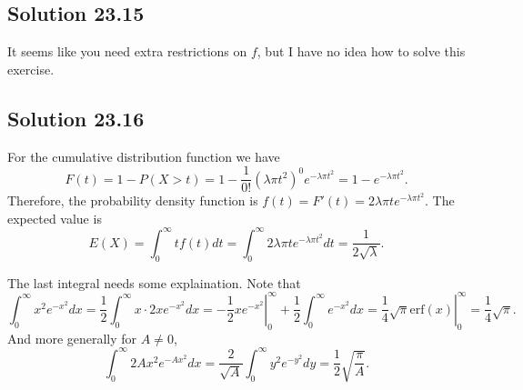 \subsection*{Solution 23.15}

It seems like you need extra restrictions on $f$, but I have no idea how to solve this exercise.


\subsection*{Solution 23.16}

For the cumulative distribution function we have
\begin{equation*}
    F(t) = 1 - P(X > t)
        = 1 - \frac{1}{0!} (\lambda \pi t^2)^0 e^{-\lambda \pi t^2}
        = 1 - e^{-\lambda \pi t^2}.
\end{equation*}
Therefore, the probability density function is $f(t) = F'(t) = 2 \lambda \pi t e^{-\lambda \pi t^2}$.
The expected value is
\begin{equation*}
    E(X) = \int_0^{\infty} t f(t) dt
        = \int_0^{\infty} 2 \lambda \pi t e^{-\lambda \pi t^2} dt
        = \frac{1}{2 \sqrt{\lambda}}.
\end{equation*}

The last integral needs some explaination.
Note that
\begin{equation*}
    \int_0^{\infty} x^2 e^{-x^2} dx
        = \frac{1}{2} \int_0^{\infty} x \cdot 2 x e^{-x^2} dx
        = \left. -\frac{1}{2} x e^{-x^2} \right|_0^{\infty} + \frac{1}{2} \int_0^{\infty} e^{-x^2} dx
        = \left. \frac{1}{4} \sqrt{\pi} \mathrm{erf}(x) \right|_0^{\infty}
        = \frac{1}{4} \sqrt{\pi}.
\end{equation*}
And more generally for $A \neq 0$,
\begin{equation*}
    \int_0^{\infty} 2 A x^2 e^{-A x^2} dx
        = \frac{2}{\sqrt{A}} \int_0^{\infty} y^2 e^{-y^2} dy
        = \frac{1}{2} \sqrt{\frac{\pi}{A}}.
\end{equation*}
